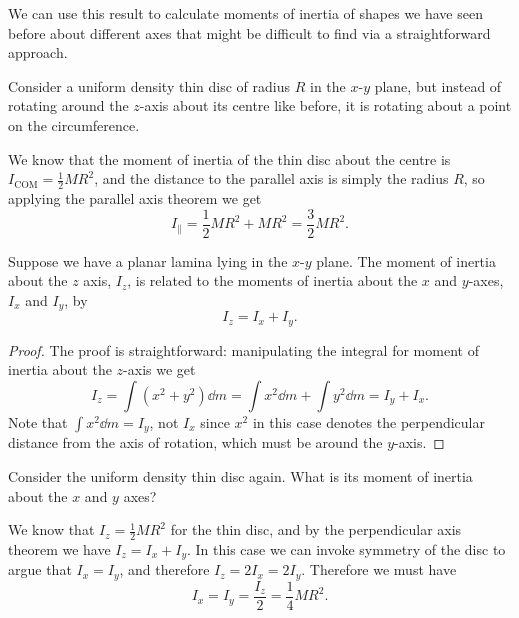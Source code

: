 \documentclass[../classical_mechanics.tex]{subfiles}
\begin{document}
            We can use this result to calculate moments of inertia of shapes we have seen before about different axes that might be difficult to find via a straightforward approach.
            \begin{example}
                Consider a uniform density thin disc of radius $R$ in the $x$-$y$ plane, but instead of rotating around the $z$-axis about its centre like before, it is rotating about a point on the circumference.
                
                We know that the moment of inertia of the thin disc about the centre is $I_\text{COM}=\frac{1}{2}MR^2$, and the distance to the parallel axis is simply the radius $R$, so applying the parallel axis theorem we get
                \begin{equation}
                    I_\parallel=\frac{1}{2}MR^2+MR^2=\frac{3}{2}MR^2.
                \end{equation}
            \end{example}
            \begin{theorem}
                Suppose we have a planar lamina lying in the $x$-$y$ plane.
                The moment of inertia about the $z$ axis, $I_z$, is related to the moments of inertia about the $x$ and $y$-axes, $I_x$ and $I_y$, by
                \begin{equation}
                    I_z=I_x+I_y.
                \end{equation}
            \end{theorem}
            \begin{proof}
                The proof is straightforward: manipulating the integral for moment of inertia about the $z$-axis we get
                \begin{equation}
                    I_z=\int(x^2+y^2)\dd{m}=\int x^2\dd{m}+\int y^2\dd{m}=I_y+I_x.
                \end{equation}
                Note that $\int x^2\dd{m}=I_y$, not $I_x$ since $x^2$ in this case denotes the perpendicular distance from the axis of rotation, which must be around the $y$-axis.
            \end{proof}
            \begin{example}
                Consider the uniform density thin disc again.
                What is its moment of inertia about the $x$ and $y$ axes?

                We know that $I_z=\frac{1}{2}MR^2$ for the thin disc, and by the perpendicular axis theorem we have $I_z=I_x+I_y$.
                In this case we can invoke symmetry of the disc to argue that $I_x=I_y$, and therefore $I_z=2I_x=2I_y$.
                Therefore we must have
                \begin{equation}
                    I_x=I_y=\frac{I_z}{2}=\frac{1}{4}MR^2.
                \end{equation}
            \end{example}
\end{document}
